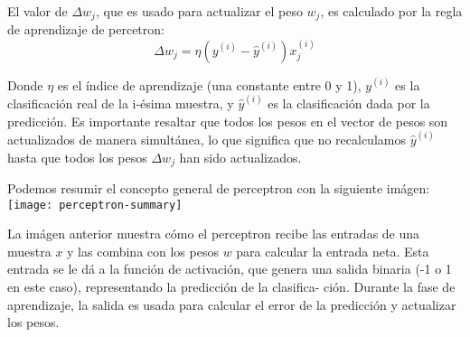 El valor de $\Delta w_j$, que es usado para actualizar el peso $w_j$, es
calculado por la regla de aprendizaje de percetron:
\begin{equation}
  \Delta w_j = \eta (y^{(i)} - \hat y^{(i)})x^{(i)}_j
\end{equation}

Donde $\eta$ es el índice de aprendizaje (una constante entre 0 y 1),
$y^{(i)}$ es la clasificación real de la i-ésima muestra, y $\hat y^{(i)}$
es la clasificación dada por la predicción. Es importante resaltar que
todos los pesos en el vector de pesos son actualizados de manera
simultánea, lo que significa que no recalculamos $\hat y^{(i)}$ hasta que
todos los pesos $\Delta w_j$ han sido actualizados.

Podemos resumir el concepto general de perceptron con la siguiente imágen:
\texttt{[image: perceptron-summary]}

La imágen anterior muestra cómo el perceptron recibe las entradas de una
muestra $x$ y las combina con los pesos $w$ para calcular la entrada neta.
Esta entrada se le dá a la función de activación, que genera una salida
binaria (-1 o 1 en este caso), representando la predicción de la clasifica-
ción. Durante la fase de aprendizaje, la salida es usada para calcular el
error de la predicción y actualizar los pesos.
